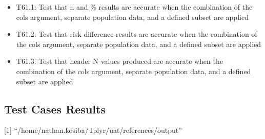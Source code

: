 \documentclass[
]{article}
\providecommand{\tightlist}{%
  \setlength{\itemsep}{0pt}\setlength{\parskip}{0pt}}
\begin{document}
\begin{itemize}
\begin{itemize}
    \begin{itemize}
    \tightlist
    \item
      T61.1: Test that n and \% results are accurate when the
      combination of the cols argument, separate population data, and a
      defined subset are applied
    \item
      T61.2: Test that risk difference results are accurate when the
      combination of the cols argument, separate population data, and a
      defined subset are applied
    \item
      T61.3: Test that header N values produced are accurate when the
      combination of the cols argument, separate population data, and a
      defined subset are applied
    \end{itemize}
  \end{itemize}
\end{itemize}

\hypertarget{test-cases-results}{%
\subsection{Test Cases Results}\label{test-cases-results}}

{[}1{]} ``/home/nathan.kosiba/Tplyr/uat/references/output''
\end{document}
